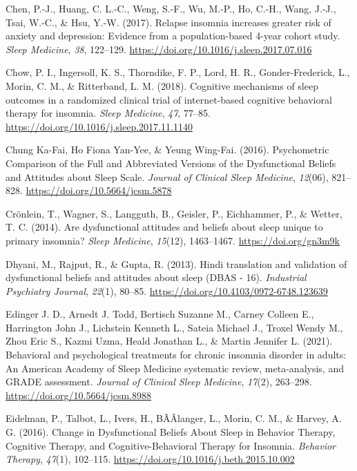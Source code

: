 \documentclass[
  ,doc,11pt, twoside,floatsintext]{apa6}
\newlength{\cslhangindent}
\newlength{\cslentryspacingunit} %
\newenvironment{CSLReferences}[2] %
 {%
  \setlength{\parindent}{0pt}
  \ifodd #1
  \let\oldpar\par
  \def\par{\hangindent=\cslhangindent\oldpar}
  \fi
  \setlength{\parskip}{#2\cslentryspacingunit}
 }%
 {}
\begin{document}
\begin{CSLReferences}{1}{0}
\leavevmode{}%
Chen, P.-J., Huang, C. L.-C., Weng, S.-F., Wu, M.-P., Ho, C.-H., Wang, J.-J., Tsai, W.-C., \& Hsu, Y.-W. (2017). Relapse insomnia increases greater risk of anxiety and depression: Evidence from a population-based 4-year cohort study. \emph{Sleep Medicine}, \emph{38}, 122--129. \url{https://doi.org/10.1016/j.sleep.2017.07.016}

\leavevmode{}%
Chow, P. I., Ingersoll, K. S., Thorndike, F. P., Lord, H. R., Gonder-Frederick, L., Morin, C. M., \& Ritterband, L. M. (2018). Cognitive mechanisms of sleep outcomes in a randomized clinical trial of internet-based cognitive behavioral therapy for insomnia. \emph{Sleep Medicine}, \emph{47}, 77--85. \url{https://doi.org/10.1016/j.sleep.2017.11.1140}

\leavevmode{}%
Chung Ka-Fai, Ho Fiona Yan-Yee, \& Yeung Wing-Fai. (2016). Psychometric {Comparison} of the {Full} and {Abbreviated Versions} of the {Dysfunctional Beliefs} and {Attitudes} about {Sleep Scale}. \emph{Journal of Clinical Sleep Medicine}, \emph{12}(06), 821--828. \url{https://doi.org/10.5664/jcsm.5878}

\leavevmode{}%
Crönlein, T., Wagner, S., Langguth, B., Geisler, P., Eichhammer, P., \& Wetter, T. C. (2014). Are dysfunctional attitudes and beliefs about sleep unique to primary insomnia? \emph{Sleep Medicine}, \emph{15}(12), 1463--1467. \url{https://doi.org/gn3m9k}

\leavevmode{}%
Dhyani, M., Rajput, R., \& Gupta, R. (2013). Hindi translation and validation of dysfunctional beliefs and attitudes about sleep ({DBAS} - 16). \emph{Industrial Psychiatry Journal}, \emph{22}(1), 80--85. \url{https://doi.org/10.4103/0972-6748.123639}

\leavevmode{}%
Edinger J. D., Arnedt J. Todd, Bertisch Suzanne M., Carney Colleen E., Harrington John J., Lichstein Kenneth L., Sateia Michael J., Troxel Wendy M., Zhou Eric S., Kazmi Uzma, Heald Jonathan L., \& Martin Jennifer L. (2021). Behavioral and psychological treatments for chronic insomnia disorder in adults: An {American Academy} of {Sleep Medicine} systematic review, meta-analysis, and {GRADE} assessment. \emph{Journal of Clinical Sleep Medicine}, \emph{17}(2), 263--298. \url{https://doi.org/10.5664/jcsm.8988}

\leavevmode{}%
Eidelman, P., Talbot, L., Ivers, H., BÃÂlanger, L., Morin, C. M., \& Harvey, A. G. (2016). Change in {Dysfunctional Beliefs About Sleep} in {Behavior Therapy}, {Cognitive Therapy}, and {Cognitive-Behavioral Therapy} for {Insomnia}. \emph{Behavior Therapy}, \emph{47}(1), 102--115. \url{https://doi.org/10.1016/j.beth.2015.10.002}


\end{CSLReferences}
\end{document}
